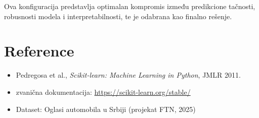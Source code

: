 \documentclass[a4paper,12pt]{article}
\begin{document}
Ova konfiguracija predstavlja optimalan kompromis između predikcione tačnosti, robusnosti modela i interpretabilnosti, te je odabrana kao finalno rešenje.

\section*{Reference}

\begin{itemize}
    \item Pedregosa et al., \textit{Scikit-learn: Machine Learning in Python}, JMLR 2011.
    \item zvanična dokumentacija: \url{https://scikit-learn.org/stable/}
    \item Dataset: Oglasi automobila u Srbiji (projekat FTN, 2025)
\end{itemize}
\end{document}
